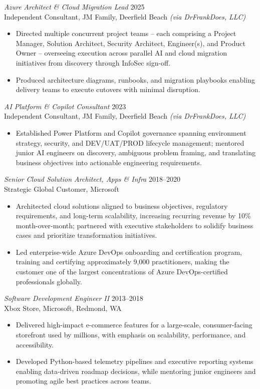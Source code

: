 \documentclass[margin]{res}
\begin{document}
\begin{resume}
{\sl Azure Architect \& Cloud Migration Lead} \hfill 2025\\
Independent Consultant, JM Family, Deerfield Beach \emph{(via DrFrankDoes, LLC)}
\begin{itemize}
\item Directed multiple concurrent project teams -- each comprising a Project Manager, Solution Architect, Security Architect, Engineer(s), and Product Owner -- overseeing execution across parallel AI and cloud migration initiatives from discovery through InfoSec sign-off.
\item Produced architecture diagrams, runbooks, and migration playbooks enabling delivery teams to execute cutovers with minimal disruption.
\end{itemize}

{\sl AI Platform \& Copilot Consultant} \hfill 2023\\
Independent Consultant, JM Family, Deerfield Beach \emph{(via DrFrankDoes, LLC)}
\begin{itemize}
\item Established Power Platform and Copilot governance spanning environment strategy, security, and DEV/UAT/PROD lifecycle management; mentored junior AI engineers on discovery, ambiguous problem framing, and translating business objectives into actionable engineering requirements.
\end{itemize}

{\sl Senior Cloud Solution Architect, Apps \& Infra} \hfill 2018--2020\\
Strategic Global Customer, Microsoft
\begin{itemize}
\item Architected cloud solutions aligned to business objectives, regulatory requirements, and long-term scalability, increasing recurring revenue by 10\% month-over-month; partnered with executive stakeholders to solidify business cases and prioritize transformation initiatives.
\item Led enterprise-wide Azure DevOps onboarding and certification program, training and certifying approximately 9,000 practitioners, making the customer one of the largest concentrations of Azure DevOps-certified professionals globally.
\end{itemize}

{\sl Software Development Engineer II} \hfill 2013--2018\\
Xbox Store, Microsoft, Redmond, WA
\begin{itemize}
\item Delivered high-impact e-commerce features for a large-scale, consumer-facing storefront used by millions, with emphasis on scalability, performance, and accessibility.
\item Developed Python-based telemetry pipelines and executive reporting systems enabling data-driven roadmap decisions, while mentoring junior engineers and promoting agile best practices across teams.
\end{itemize}


\end{resume}
\end{document}
